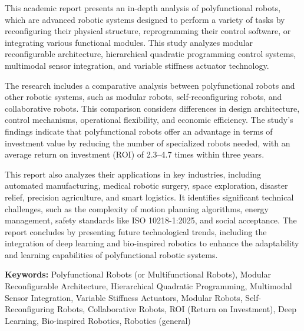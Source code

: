 \documentclass[a4paper]{article}
\begin{document}
\begin{justify}
  This academic report presents an in-depth analysis of polyfunctional robots, which are advanced robotic systems designed to perform a variety of tasks by reconfiguring their physical structure, reprogramming their control software, or integrating various functional modules. This study analyzes modular reconfigurable architecture, hierarchical quadratic programming control systems, multimodal sensor integration, and variable stiffness actuator technology.

  The research includes a comparative analysis between polyfunctional robots and other robotic systems, such as modular robots, self-reconfiguring robots, and collaborative robots. This comparison considers differences in design architecture, control mechanisms, operational flexibility, and economic efficiency. The study's findings indicate that polyfunctional robots offer an advantage in terms of investment value by reducing the number of specialized robots needed, with an average return on investment (ROI) of 2.3–4.7 times within three years.
  
  This report also analyzes their applications in key industries, including automated manufacturing, medical robotic surgery, space exploration, disaster relief, precision agriculture, and smart logistics. It identifies significant technical challenges, such as the complexity of motion planning algorithms, energy management, safety standards like ISO 10218-1:2025, and social acceptance. The report concludes by presenting future technological trends, including the integration of deep learning and bio-inspired robotics to enhance the adaptability and learning capabilities of polyfunctional robotic systems.
\end{justify}

\vspace{1em}

\noindent
\textbf{Keywords:} Polyfunctional Robots (or Multifunctional Robots),
Modular Reconfigurable Architecture,
Hierarchical Quadratic Programming,
Multimodal Sensor Integration,
Variable Stiffness Actuators,
Modular Robots,
Self-Reconfiguring Robots,
Collaborative Robots,
ROI (Return on Investment),
Deep Learning,
Bio-inspired Robotics,
Robotics (general)
\newpage

\tableofcontents
\newpage

\setcounter{page}{1}
\end{document}
